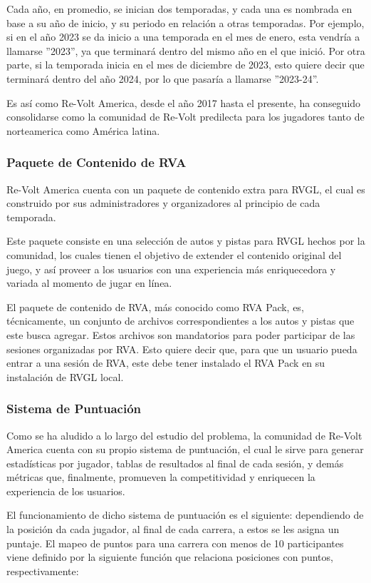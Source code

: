 Cada año, en promedio, se inician dos temporadas, y cada una es nombrada en base a su año de inicio, y su periodo en relación a otras temporadas. Por ejemplo, si en el año 2023 se da inicio a una temporada en el mes de enero, esta vendría a llamarse ''2023'', ya que terminará dentro del mismo año en el que inició. Por otra parte, si la temporada inicia en el mes de diciembre de 2023, esto quiere decir que terminará dentro del año 2024, por lo que pasaría a llamarse ''2023-24''.

Es así como Re-Volt America, desde el año 2017 hasta el presente, ha conseguido consolidarse como la comunidad de Re-Volt predilecta para los jugadores tanto de norteamerica como América latina.

\subsubsection{Paquete de Contenido de RVA}
\label{problem:context:rva:pack}
Re-Volt America cuenta con un paquete de contenido extra para RVGL, el cual es construido por sus administradores y organizadores al principio de cada temporada.

Este paquete consiste en una selección de autos y pistas para RVGL hechos por la comunidad, los cuales tienen el objetivo de extender el contenido original del juego, y así proveer a los usuarios con una experiencia más enriquecedora y variada al momento de jugar en línea.

El paquete de contenido de RVA, más conocido como RVA Pack, es, técnicamente, un conjunto de archivos correspondientes a los autos y pistas que este busca agregar. Estos archivos son mandatorios para poder participar de las sesiones organizadas por RVA. Esto quiere decir que, para que un usuario pueda entrar a una sesión de RVA, este debe tener instalado el RVA Pack en su instalación de RVGL local.

\subsubsection{Sistema de Puntuación}
Como se ha aludido a lo largo del estudio del problema, la comunidad de Re-Volt America cuenta con su propio sistema de puntuación, el cual le sirve para generar estadísticas por jugador, tablas de resultados al final de cada sesión, y demás métricas que, finalmente, promueven la competitividad y enriquecen la experiencia de los usuarios.

El funcionamiento de dicho sistema de puntuación es el siguiente: dependiendo de la posición da cada jugador, al final de cada carrera, a estos se les asigna un puntaje. El mapeo de puntos para una carrera con menos de 10 participantes viene definido por la siguiente función que relaciona posiciones con puntos, respectivamente:

